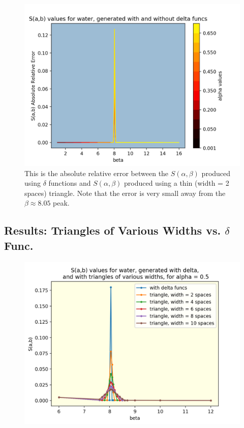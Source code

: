 \documentclass[10pt]{article}
\begin{document}
\begin{multicols}{2}
            \begin{figure}[H]
              \begin{center}
              \includegraphics[scale=0.6]{sab_thinTriangle_error}
                \caption{This is the absolute relative error between the $S(\alpha,\beta)$ produced using $\delta$ functions and $S(\alpha,\beta)$ produced using a thin (width = 2 spaces) triangle. Note that the error is very small away from the $\beta\approx8.05$ peak. }
              \label{fig:sabThinTriangleError}
              \end{center}
            \end{figure}




\subsection*{Results: Triangles of Various Widths vs. $\delta$ Func.}

            \begin{figure}[H]
              \begin{center}
              \includegraphics[scale=0.6]{diff_widths_alpha_0p5}
                \caption{}
              \label{fig:diff_widths_alpha_0p5}
              \end{center}
            \end{figure}


\end{multicols}
\end{document}
